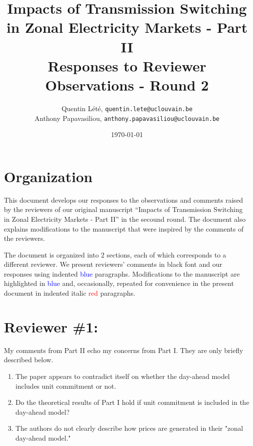 \documentclass[a4paper,11pt]{article}
\title{Impacts of Transmission Switching in Zonal Electricity Markets - Part II \\[.25cm]
	\Large{Responses to Reviewer Observations - Round 2}}
\author{Quentin Lété, \texttt{quentin.lete@uclouvain.be} \\
	Anthony Papavasiliou, \texttt{anthony.papavasiliou@uclouvain.be}}
\date{\today}
\begin{document}
\maketitle

\section*{Organization}

This document develops our responses to the observations and comments raised by the reviewers of our original manuscript ``Impacts of Transmission Switching in Zonal Electricity Markets - Part II'' in the secound round. The document also explains modifications to the manuscript that were inspired by the comments of the reviewers.

The document is organized into 2 sections, each of which corresponds to a different reviewer. We present reviewers' comments in black font and our responses using indented \textcolor{blue}{blue} paragraphs. Modifications to the manuscript are highlighted in \textcolor{blue}{blue} and, occasionally, repeated for convenience in the present document in indented italic \textcolor{red}{red} paragraphs.

\section{Reviewer \#1:}
My comments from Part II echo my concerns from Part I. They are only briefly described below.


\begin{enumerate}
    \item The paper appears to contradict itself on whether the day-ahead model includes unit commitment or not.
    \item Do the theoretical results of Part I hold if unit commitment is included in the day-ahead model?
\end{enumerate}


\begin{enumerate}
    \setcounter{enumi}{2}
    \item The authors do not clearly describe how prices are generated in their "zonal day-ahead model."
\end{enumerate}
\end{document}
